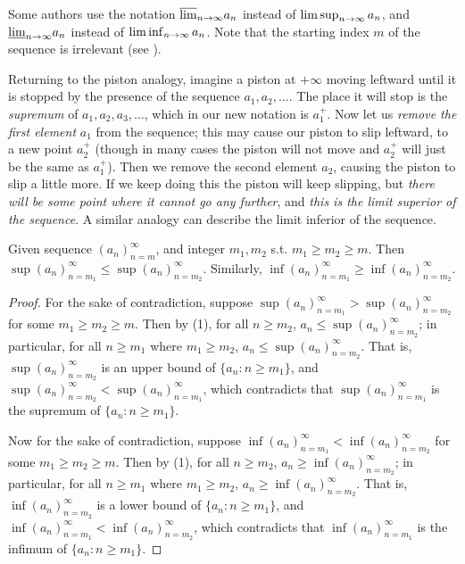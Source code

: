 \begin{remark} \label{remark 6.4.11}
\sloppy Some authors use the notation \(\overline{\lim}_{n \to \infty} a_n\) instead of \(\limsup_{n \to \infty} a_n\), and \(\underline{\lim}_{n \to \infty} a_n\) instead of \(\liminf_{n \to \infty} a_n\).
Note that the starting index \(m\) of the sequence is irrelevant (see ).
\end{remark}

\begin{note}
Returning to the piston analogy, imagine a piston at \(+\infty\) moving leftward until it is stopped by the presence of the sequence \(a_1, a_2, \dots\).
The place it will stop is the \emph{supremum} of \(a_1, a_2, a_3, \dots\), which in our new notation is \(a_1^+\).
Now let us \emph{remove the first element} \(a_1\) from the sequence;
this may cause our piston to slip leftward, to a new point \(a_2^+\)
(though in many cases the piston will not move and \(a_2^+\) will just be the same as \(a_1^+\)).
Then we remove the second element \(a_2\), causing the piston to slip a little more.
If we keep doing this the piston will keep slipping, but \emph{there will be some point where it cannot go any further}, and \emph{this is the limit superior of the sequence}.
A similar analogy can describe the limit inferior of the sequence.
\end{note}

\begin{additional corollary}  \label{ac 6.4.2}
Given sequence \((a_n)_{n = m}^{\infty}\), and integer \(m_1, m_2\) s.t. \(m_1 \ge m_2 \ge m\).
Then \(\sup(a_n)_{n = m_1}^{\infty} \le \sup(a_n)_{n = m_2}^{\infty}\).
Similarly, \(\inf(a_n)_{n = m_1}^{\infty} \ge \inf(a_n)_{n = m_2}^{\infty}\).
\end{additional corollary}

\begin{proof}
For the sake of contradiction, suppose \(\sup(a_n)_{n = m_1}^{\infty} > \sup(a_n)_{n = m_2}^{\infty}\) for some \(m_1 \ge m_2 \ge m\).
Then by (1), for all \(n \ge m_2\), \(a_n \le \sup(a_n)_{n = m_2}^{\infty}\);
in particular, for all \(n \ge m_1\) where \(m_1 \ge m_2\), \(a_n \le \sup(a_n)_{n = m_2}^{\infty}\).
That is, \(\sup(a_n)_{n = m_2}^{\infty}\) is an upper bound of \(\{a_n : n \ge m_1\}\),
and \(\sup(a_n)_{n = m_2}^{\infty} < \sup(a_n)_{n = m_1}^{\infty}\),
which contradicts that \(\sup(a_n)_{n = m_1}^{\infty}\) is the supremum of \(\{a_n : n \ge m_1\}\).

Now for the sake of contradiction, suppose \(\inf(a_n)_{n = m_1}^{\infty} < \inf(a_n)_{n = m_2}^{\infty}\) for some \(m_1 \ge m_2 \ge m\).
Then by (1), for all \(n \ge m_2\), \(a_n \ge \inf(a_n)_{n = m_2}^{\infty}\);
in particular, for all \(n \ge m_1\) where \(m_1 \ge m_2\), \(a_n \ge \inf(a_n)_{n = m_2}^{\infty}\).
That is, \(\inf(a_n)_{n = m_2}^{\infty}\) is a lower bound of \(\{a_n : n \ge m_1\}\),
and \(\inf(a_n)_{n = m_1}^{\infty} < \inf(a_n)_{n = m_2}^{\infty}\),
which contradicts that \(\inf(a_n)_{n = m_1}^{\infty}\) is the infimum of \(\{a_n : n \ge m_1\}\).
\end{proof}

